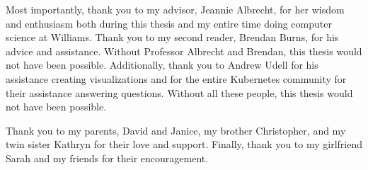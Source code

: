 Most importantly, thank you to my advisor, Jeannie Albrecht, for her wisdom and
enthusiasm both during this thesis and my entire time doing computer
science at Williams. Thank you to my second reader, Brendan Burns, for his advice
and assistance. Without Professor Albrecht and Brendan, this thesis would not
have been possible. Additionally, thank you to Andrew Udell for his assistance
creating visualizations and for the entire Kubernetes community for their
assistance answering questions. Without all these people, this thesis would not
have been possible.

Thank you to my parents, David and Janice, my brother
Christopher, and my twin sister Kathryn for their love and support. Finally, thank you to
my girlfriend Sarah and my friends for their encouragement.
